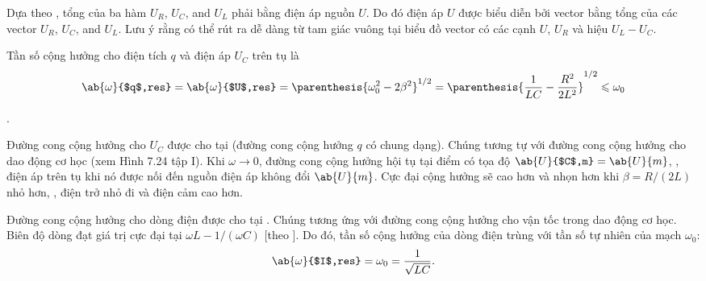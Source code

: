 \noindent
Dựa theo , tổng của ba hàm $U_R$, $U_C$, and $U_L$ phải bằng điện áp nguồn $U$.
Do đó điện áp $U$ được biểu diễn bởi vector bằng tổng của các vector $U_R$, $U_C$, and $U_L$.
Lưu ý rằng  có thể rút ra dễ dàng từ tam giác vuông tại biểu đồ vector có các cạnh $U$, $U_R$ và hiệu  $U_L-U_C$.

Tần số cộng hưởng cho điện tích $q$ và điện áp $U_C$ trên tụ là
\begin{equation}\label{eq:13_41}
    \ab{\omega}{$q$,res} = \ab{\omega}{$U$,res} = \parenthesis{\omega_0^2 - 2\beta^2}^{1/2} = \parenthesis{\frac{1}{LC} - \frac{R^2}{2L^2}}^{1/2}\leqslant \omega_0
\end{equation}

.

Đường cong cộng hưởng cho $U_C$ được cho tại  (đường cong cộng hưởng $q$ có chung dạng).
Chúng tương tự với đường cong cộng hưởng cho dao động cơ học (xem Hình 7.24 tập I).
Khi $\omega\to 0$, đường cong cộng hưởng hội tụ tại điểm có tọa độ $\ab{U}{$C$,m}=\ab{U}{m}$, \ie, điện áp trên tụ khi nó được nối đến nguồn điện áp không đổi $\ab{U}{m}$.
Cực đại cộng hưởng sẽ cao hơn và nhọn hơn khi $\beta=R/(2L)$ nhỏ hơn, \ie, điện trở nhỏ đi và điện cảm cao hơn.

Đường cong cộng hưởng cho dòng điện được cho tại .
Chúng tương ứng với đường cong cộng hưởng cho vận tốc trong dao động cơ học.
Biên độ dòng đạt giá trị cực đại tại
$\omega L - 1/(\omega C)$ [theo ]. Do đó, tần số cộng hưởng của dòng điện trùng với tần số tự nhiên của mạch $\omega_0$:
\begin{equation}\label{eq:13_42}
    \ab{\omega}{$I$,res} = \omega_0 = \frac{1}{\sqrt{LC}}.
\end{equation}

